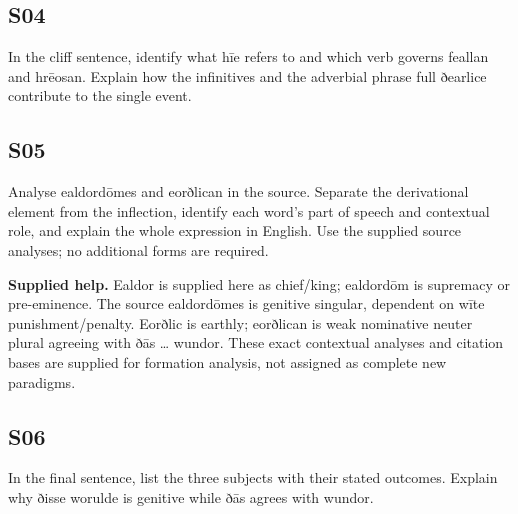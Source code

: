 \par\begin{minipage}{\linewidth}\raggedright
\subsection*{S04}

In the cliff sentence, identify what hīe refers to and which verb governs feallan and hrēosan. Explain how the infinitives and the adverbial phrase full ðearlice contribute to the single event.

\end{minipage}\par\addvspace{4pt}

\par\begin{minipage}{\linewidth}\raggedright
\subsection*{S05}

Analyse ealdordōmes and eorðlican in the source. Separate the derivational element from the inflection, identify each word’s part of speech and contextual role, and explain the whole expression in English. Use the supplied source analyses; no additional forms are required.

\end{minipage}\par\addvspace{4pt}

\textbf{Supplied help.} Ealdor is supplied here as chief/\allowbreak{}king; ealdordōm is supremacy or pre-eminence. The source ealdordōmes is genitive singular, dependent on wīte punishment/\allowbreak{}penalty. Eorðlic is earthly; eorðlican is weak nominative neuter plural agreeing with ðās … wundor. These exact contextual analyses and citation bases are supplied for formation analysis, not assigned as complete new paradigms.

\par\begin{minipage}{\linewidth}\raggedright
\subsection*{S06}

In the final sentence, list the three subjects with their stated outcomes. Explain why ðisse worulde is genitive while ðās agrees with wundor.

\end{minipage}\par\addvspace{4pt}

